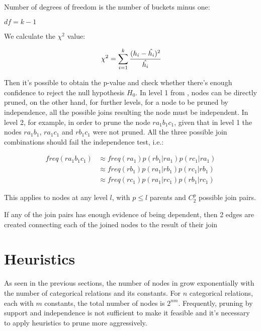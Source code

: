   

Number of degrees of freedom is the number of buckets minus one:

\begin{center}
 $df=k-1$
\end{center}

We calculate the $\chi^2$ value:

\begin{equation}
 \chi^2=\sum_{i=1}^{k} \cfrac{(h_i - \hat{h_i})^2}{\hat{h_i}}
\end{equation}

\cite{Jaroszewicz02pruningredundant}

Then it's possible to obtain the p-value and check whether there's enough confidence to reject the null hypothesis $H_0$. In level 1 from \graphname, nodes can be directly pruned, on the other hand, for further levels, for a node to be pruned by independence, all the possible joins resulting the node must be independent. In level 2, for example, in order to prune the node $r a_1 b_1 c_1$, given that in level 1 the nodes $r a_1 b_1$, $r a_1 c_1$ and $r b_1 c_1$ were not pruned. All the three possible join combinations should fail the independence test, i.e.:

\begin{equation}
\begin{split} 
  freq(r a_1 b_1 c_1) &\approx freq(r a_1)p (r b_1|r a_1) p(r c_1|r a_1) \\ 
  &\approx  freq(r b_1) p(r a_1|r b_1) p(r c_1|r b_1) \\ 
  &\approx  freq(r c_1) p(r a_1|r c_1) p(r b_1|r c_1)  
\end{split}
\end{equation}

This applies to nodes at any level $l$, with $p \leq l$ parents and $C_{2}^{p}$ possible join pairs.

If any of the join pairs has enough evidence of being dependent, then 2 edges are created connecting each of the joined nodes to the result of their join

\section{Heuristics}

As seen in the previous sections, the number of nodes in \graphname grow exponentially with the number of categorical relations and its constants. For $n$ categorical relations, each with $m$ constants, the total number of nodes is $2^{nm}$. Frequently, pruning by support and independence is not sufficient to make it feasible and it's necessary to apply heuristics to prune more aggressively.

